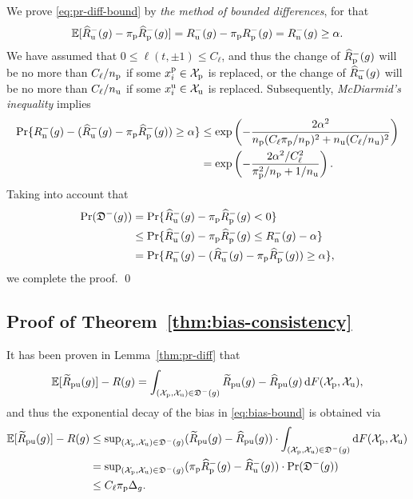 We prove \eqref{eq:pr-diff-bound} by \emph{the method of bounded differences}, for that
\begin{align*}
\bE[\hRu^-(g)-\pip\hRp^-(g)]=\Ru^-(g)-\pip\Rp^-(g)=\Rn^-(g)\ge\alpha.
\end{align*}
We have assumed that $0\le\ell(t,\pm1)\le C_\ell$, and thus the change of $\hRp^-(g)$ will be no more than $C_\ell/\Np$ if some $\xp_i\in\Xp$ is replaced, or the change of $\hRu^-(g)$ will be no more than $C_\ell/\Nu$ if some $\xu_i\in\Xu$ is replaced. Subsequently, \emph{McDiarmid's inequality} \citep{mcdiarmid89MBD} implies
\begin{align*}
\pr\{\Rn^-(g)-(\hRu^-(g)-\pip\hRp^-(g))\ge\alpha\}
&\le \exp\left(-\frac{2\alpha^2}{\Np(C_\ell\pip/\Np)^2+\Nu(C_\ell/\Nu)^2}\right)\\
&= \exp\left(-\frac{2\alpha^2/C_\ell^2}{\pip^2/\Np+1/\Nu}\right).
\end{align*}
Taking into account that
\begin{align*}
\pr(\fD^-(g)) &= \pr\{\hRu^-(g)-\pip\hRp^-(g)<0\}\\
&\le \pr\{\hRu^-(g)-\pip\hRp^-(g)\le\Rn^-(g)-\alpha\}\\
&= \pr\{\Rn^-(g)-(\hRu^-(g)-\pip\hRp^-(g))\ge\alpha\},
\end{align*}
we complete the proof. \qed

\subsection{Proof of Theorem~\ref{thm:bias-consistency}}

It has been proven in Lemma~\ref{thm:pr-diff} that
\begin{align*}
\bE[\tRpu(g)]-R(g)=\int_{(\Xp,\Xu)\in\fD^-(g)}\tRpu(g)-\hRpu(g)\,\dif F(\Xp,\Xu),
\end{align*}
and thus the exponential decay of the bias in \eqref{eq:bias-bound} is obtained via
\begin{align*}
\bE[\tRpu(g)]-R(g)
&\le \sup\nolimits_{(\Xp,\Xu)\in\fD^-(g)}(\tRpu(g)-\hRpu(g))
\cdot\int_{(\Xp,\Xu)\in\fD^-(g)}\dif F(\Xp,\Xu)\\
&= \sup\nolimits_{(\Xp,\Xu)\in\fD^-(g)}(\pip\hRp^-(g)-\hRu^-(g))\cdot\pr(\fD^-(g))\\
&\le C_\ell\pip\Delta_g.
\end{align*}

